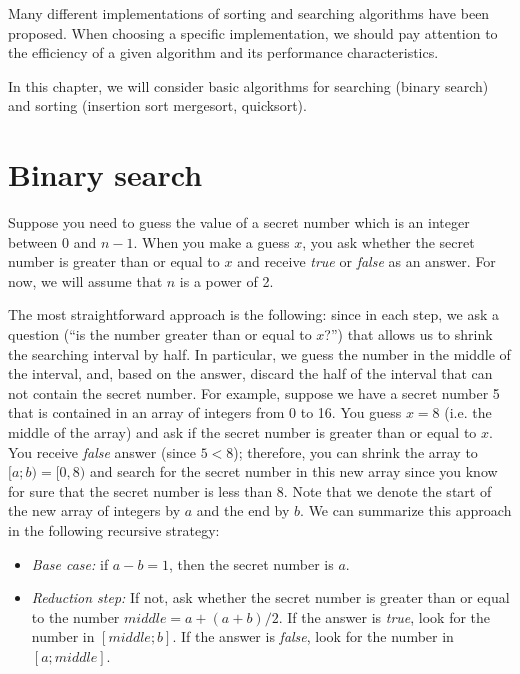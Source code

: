 Many different implementations of sorting and searching algorithms have been proposed. When choosing a specific implementation, we should pay attention to the efficiency of a given algorithm and its performance characteristics. 

In this chapter, we will consider basic algorithms for searching (binary search) and sorting (insertion sort mergesort, quicksort).  



\section{Binary search}

Suppose you need to guess the value of a secret number which is an integer between 0 and $n-1$. When you make a guess $x$, you ask whether the secret number is greater than or equal to $x$ and receive \textit{true} or \textit{false} as an answer. For now, we will assume that $n$ is a power of 2.

The most straightforward approach is the following: since in each step, we ask a question (“is the number greater than or equal to $x$?”) that allows us to shrink the searching interval by half. In particular, we guess the number in the middle of the interval, and, based on the answer, discard the half of the interval that can not contain the secret number. For example, suppose we have a secret number 5 that is contained in an array of integers from 0 to 16. You guess $x=8$ (i.e. the middle of the array) and ask if the secret number is greater than or equal to $x$. You receive \textit{false} answer (since $5 < 8$); therefore, you can shrink the array to $[a;b) = [0, 8)$ and search for the secret number in this new array since you know for sure that the secret number is less than 8. Note that we denote the start of the new array of integers by $a$ and the end by $b$.  
We can summarize this approach in the following recursive strategy:

\begin{itemize}
\item \textit{Base case:} if $a-b = 1$, then the secret number is $a$.
\item \textit{Reduction step:} If not, ask whether the secret number is greater than or equal to the number $middle = a + (a+b)/2$. If the answer is \textit{true}, look for the number in  $[middle; b]$. If the answer is \textit{false}, look for the number in $[a; middle]$.
\end{itemize}

